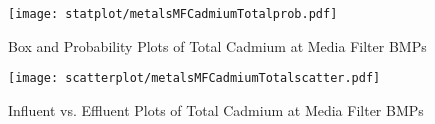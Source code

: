         \begin{figure}[hb]   %
            \centering
            \texttt{[image: statplot/metalsMFCadmiumTotalprob.pdf]}
            \caption{Box and Probability Plots of Total Cadmium at Media Filter BMPs}
        \end{figure}         %
        
        
        \begin{figure}[hb]   %
            \centering
            \texttt{[image: scatterplot/metalsMFCadmiumTotalscatter.pdf]}
            \caption{Influent vs. Effluent Plots of Total Cadmium at Media Filter BMPs}
        \end{figure}         %
        \clearpage
        